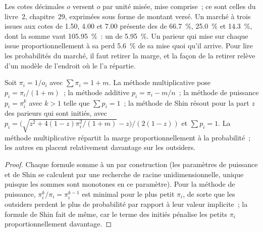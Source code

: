 Les cotes décimales $o$ versent $o$ par unité misée, mise comprise~; ce sont celles du livre~2, chapitre~29, exprimées
sous forme de montant versé. Un marché à trois issues aux cotes de 1.50, 4.00 et 7.00 présente des  de 66.7~\%, 25.0~\% et 14.3~\%, dont la somme vaut 105.95~\%~: un
 de 5.95~\%. Un parieur qui mise sur chaque issue proportionnellement à sa  perd 5.6~\% de sa mise quoi qu'il
arrive. Pour lire les probabilités du marché, il faut retirer la marge, et la façon de la retirer relève d'un modèle de l'endroit où le 
l'a répartie.

\begin{proposition}\label{prop:m3:prediction-and-betting-markets:removal}
Soit $\pi_i = 1/o_i$ avec $\sum \pi_i = 1 + m$. La méthode multiplicative pose $p_i = \pi_i/(1 + m)$~; la méthode additive $p_i = \pi_i -
m/n$~; la méthode de puissance $p_i = \pi_i^k$ avec $k > 1$ telle que $\sum p_i = 1$~; la méthode de Shin résout pour la part $z$ des parieurs qui sont
initiés, avec $p_i = \big(\sqrt{z^2 + 4(1 - z)\pi_i^2/(1 + m)} - z\big)/(2(1 - z))$ et $\sum p_i = 1$. La méthode multiplicative répartit la
marge proportionnellement à la probabilité~; les autres en placent relativement davantage sur les outsiders.
\end{proposition}

\begin{proof}
Chaque formule somme à un par construction (les paramètres de puissance et de Shin se calculent par une recherche de racine unidimensionnelle, unique puisque les sommes sont
monotones en ce paramètre). Pour la méthode de puissance, $\pi_i^k/\pi_i = \pi_i^{k - 1}$ est minimal pour le plus petit $\pi_i$, de sorte que les outsiders
perdent le plus de probabilité par rapport à leur valeur implicite~; la formule de Shin fait de même, car le terme des initiés pénalise les petits
$\pi_i$ proportionnellement davantage.
\end{proof}

